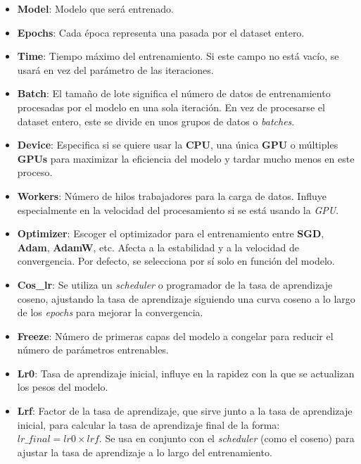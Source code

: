 \documentclass[11pt]{article}
\begin{document}
\begin{itemize}
    \item \textbf{Model}: Modelo que será entrenado.

    \item \textbf{Epochs}: Cada época representa una pasada por el dataset entero.
    
    \item \textbf{Time}: Tiempo máximo del entrenamiento. Si este campo no está vacío, se usará en vez del parámetro de las iteraciones.

    \item \textbf{Batch}: El tamaño de lote significa el número de datos de entrenamiento procesadas por el modelo en una sola iteración. En vez de procesarse el dataset entero, este se divide en unos grupos de datos o \textit{batches}.

    \item \textbf{Device}: Especifica si se quiere usar la \textbf{CPU}, una única \textbf{GPU} o múltiples \textbf{GPUs} para maximizar la eficiencia del modelo y tardar mucho menos en este proceso.

    \item \textbf{Workers}: Número de hilos trabajadores para la carga de datos. Influye especialmente en la velocidad del procesamiento si se está usando la \textit{GPU}.

    \item \textbf{Optimizer}: Escoger el optimizador para el entrenamiento entre \textbf{SGD}, \textbf{Adam}, \textbf{AdamW}, etc. Afecta a la estabilidad y a la velocidad de convergencia. Por defecto, se selecciona por sí solo en función del modelo.

    \item \textbf{Cos\_lr}: Se utiliza un \textit{scheduler} o programador de la tasa de aprendizaje coseno, ajustando la tasa de aprendizaje siguiendo una curva coseno a lo largo de los \textit{epochs} para mejorar la convergencia.

    \item \textbf{Freeze}: Número de primeras capas del modelo a congelar para reducir el número de parámetros entrenables.

    \item \textbf{Lr0}: Tasa de aprendizaje inicial, influye en la rapidez con la que se actualizan los pesos del modelo.

    \item \textbf{Lrf}: Factor de la tasa de aprendizaje, que sirve junto a la tasa de aprendizaje inicial, para calcular la tasa de aprendizaje final de la forma: $lr\_final = lr0 \times lrf$. Se usa en conjunto con el \textit{scheduler} (como el coseno) para ajustar la tasa de aprendizaje a lo largo del entrenamiento.


\end{itemize}
\end{document}
